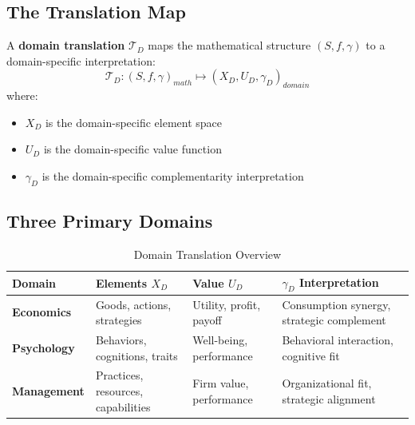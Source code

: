 \subsection{The Translation Map}

\begin{definition}
A \textbf{domain translation} $\mathcal{T}_D$ maps the mathematical structure $(S, f, \gamma)$ to a domain-specific interpretation:
\begin{equation}
\mathcal{T}_D: (S, f, \gamma)_{math} \mapsto (X_D, U_D, \gamma_D)_{domain}
\end{equation}
where:
\begin{itemize}[noitemsep]
    \item $X_D$ is the domain-specific element space
    \item $U_D$ is the domain-specific value function
    \item $\gamma_D$ is the domain-specific complementarity interpretation
\end{itemize}
\end{definition}

\subsection{Three Primary Domains}

\begin{table}[h]
\centering
\caption{Domain Translation Overview}
\label{tab:domain-overview}
\renewcommand{\arraystretch}{1.4}
\begin{tabular}{@{}p{2.5cm}p{3cm}p{3cm}p{4cm}@{}}
\toprule
\textbf{Domain} & \textbf{Elements $X_D$} & \textbf{Value $U_D$} & \textbf{$\gamma_D$ Interpretation} \\
\midrule
\textbf{Economics} & Goods, actions, strategies & Utility, profit, payoff & Consumption synergy, strategic complement \\
\textbf{Psychology} & Behaviors, cognitions, traits & Well-being, performance & Behavioral interaction, cognitive fit \\
\textbf{Management} & Practices, resources, capabilities & Firm value, performance & Organizational fit, strategic alignment \\
\bottomrule
\end{tabular}
\end{table}

